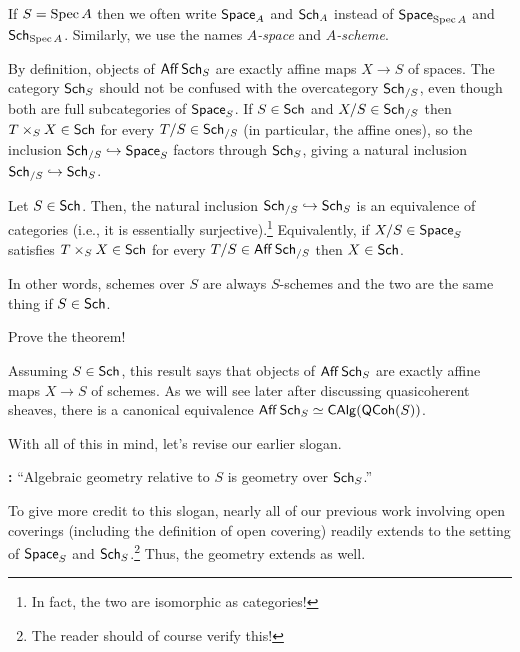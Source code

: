 \documentclass[11pt]{article}
\begin{document}
\begin{remark}
If $S=\operatorname{Spec} A$ then we often write $\operatorname{\mathsf{Space}}_A$ and $\operatorname{\mathsf{Sch}}_A$ instead of $\operatorname{\mathsf{Space}}_{\operatorname{Spec} A}$ and $\operatorname{\mathsf{Sch}}_{\operatorname{Spec} A}$. Similarly, we use the names \emph{$A$-space} and \emph{$A$-scheme}.
\end{remark}

By definition, objects of $\operatorname{\mathsf{Aff}}\operatorname{\mathsf{Sch}}_S$ are exactly affine maps $X\to S$ of spaces. The category $\operatorname{\mathsf{Sch}}_S$ should not be confused with the overcategory $\operatorname{\mathsf{Sch}}_{/S}$, even though both are full subcategories of $\operatorname{\mathsf{Space}}_S$. If $S\in\operatorname{\mathsf{Sch}}$ and $X/S\in\operatorname{\mathsf{Sch}}_{/S}$ then $T\times_SX\in\operatorname{\mathsf{Sch}}$ for every $T/S\in\operatorname{\mathsf{Sch}}_{/S}$ (in particular, the affine ones), so the inclusion $\operatorname{\mathsf{Sch}}_{/S}\hookrightarrow\operatorname{\mathsf{Space}}_S$ factors through $\operatorname{\mathsf{Sch}}_S$, giving a natural inclusion $\operatorname{\mathsf{Sch}}_{/S}\hookrightarrow\operatorname{\mathsf{Sch}}_S$. 

\begin{theorem}
Let $S\in\operatorname{\mathsf{Sch}}$. Then, the natural inclusion $\operatorname{\mathsf{Sch}}_{/S}\hookrightarrow\operatorname{\mathsf{Sch}}_S$ is an equivalence of categories (i.e., it is essentially surjective).\footnote{In fact, the two are isomorphic as categories!} Equivalently, if $X/S\in\operatorname{\mathsf{Space}}_S$ satisfies $T\times_SX\in\operatorname{\mathsf{Sch}}$ for every $T/S\in\operatorname{\mathsf{Aff}}\operatorname{\mathsf{Sch}}_{/S}$ then $X\in\operatorname{\mathsf{Sch}}$.
\end{theorem}

In other words, schemes over $S$ are always $S$-schemes and the two are the same thing if $S\in\operatorname{\mathsf{Sch}}$.

\begin{exercise}
Prove the theorem!
\end{exercise}

\begin{remark}
Assuming $S\in\operatorname{\mathsf{Sch}}$, this result says that objects of $\operatorname{\mathsf{Aff}}\operatorname{\mathsf{Sch}}_S$ are exactly affine maps $X\to S$ of schemes. As we will see later after discussing quasicoherent sheaves, there is a canonical equivalence $\operatorname{\mathsf{Aff}}\operatorname{\mathsf{Sch}}_S\simeq\operatorname{\mathsf{CAlg}}(\operatorname{\mathsf{QCoh}}(S))$.
\end{remark}

With all of this in mind, let's revise our earlier slogan.

\textbf{:} ``Algebraic geometry relative to $S$ is geometry over $\operatorname{\mathsf{Sch}}_S$.''

\begin{remark}
To give more credit to this slogan, nearly all of our previous work involving open coverings (including the definition of open covering) readily extends to the setting of $\operatorname{\mathsf{Space}}_S$ and $\operatorname{\mathsf{Sch}}_S$.\footnote{The reader should of course verify this!} Thus, the geometry extends as well.
\end{remark}
\end{document}
